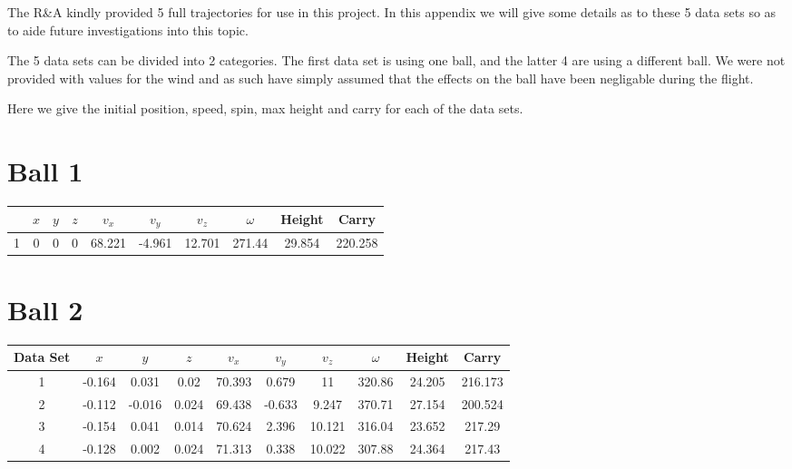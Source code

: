 The R\&A kindly provided 5 full trajectories for use in this project. In this appendix we will
give some details as to these 5 data sets so as to aide future investigations into this topic.

The 5 data sets can be divided into 2 categories. The first data set is using one ball, and the latter
4 are using a different ball. We were not provided with values for the wind and as such have simply
assumed that the effects on the ball have been negligable during the flight.

Here we give the initial position, speed, spin, max height and carry for each of the data sets.

\section{Ball 1}

\begin{table}[h]
\centering
\begin{tabular}{c|c|c|c|c|c|c|c|c|c}
 & $x$ & $y$ & $z$ & $v_x$ & $v_y$ & $v_z$ & $\omega$ & Height & Carry \\ \hline
1 & 0 & 0 & 0 & 68.221 & -4.961 & 12.701 & 271.44 & 29.854 & 220.258
\end{tabular}
\end{table}

\section{Ball 2}
\begin{table}[h]
\centering
\begin{tabular}{c|c|c|c|c|c|c|c|c|c}
Data Set & $x$ & $y$ & $z$ & $v_x$ & $v_y$ & $v_z$ & $\omega$ & Height & Carry \\ \hline
1 & -0.164 & 0.031 & 0.02 & 70.393 & 0.679 & 11 & 320.86 & 24.205 & 216.173 \\
2 & -0.112 & -0.016 & 0.024 & 69.438 & -0.633 & 9.247 & 370.71 & 27.154 & 200.524 \\
3 & -0.154 & 0.041 & 0.014 & 70.624 & 2.396 & 10.121 & 316.04 & 23.652 & 217.29 \\
4 & -0.128 & 0.002 & 0.024 & 71.313 & 0.338 & 10.022 & 307.88 & 24.364 & 217.43 
\end{tabular}
\end{table}